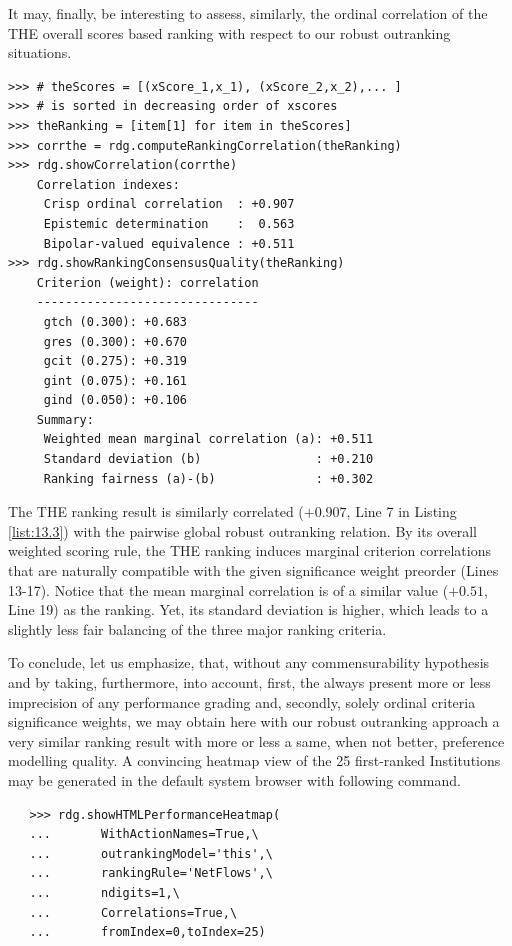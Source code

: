It may, finally, be interesting to assess, similarly, the ordinal correlation of the THE overall scores based ranking with respect to our robust outranking situations.

\begin{lstlisting}[caption={Computing the ordinal quality of the THE ranking},label=list:13.13]
>>> # theScores = [(xScore_1,x_1), (xScore_2,x_2),... ]
>>> # is sorted in decreasing order of xscores
>>> theRanking = [item[1] for item in theScores]
>>> corrthe = rdg.computeRankingCorrelation(theRanking)
>>> rdg.showCorrelation(corrthe)
    Correlation indexes:
     Crisp ordinal correlation  : +0.907
     Epistemic determination    :  0.563
     Bipolar-valued equivalence : +0.511
>>> rdg.showRankingConsensusQuality(theRanking)
    Criterion (weight): correlation
    -------------------------------
     gtch (0.300): +0.683
     gres (0.300): +0.670
     gcit (0.275): +0.319
     gint (0.075): +0.161
     gind (0.050): +0.106
    Summary:
     Weighted mean marginal correlation (a): +0.511
     Standard deviation (b)                : +0.210
     Ranking fairness (a)-(b)              : +0.302
\end{lstlisting}

The THE ranking result is similarly correlated ($+0.907$, Line 7 in Listing \ref{list:13.3}) with the pairwise global robust outranking relation. By its overall weighted scoring rule, the THE ranking induces marginal criterion correlations that are naturally compatible with the given significance weight preorder (Lines 13-17). Notice that the mean marginal correlation is of a similar value ($+0.51$, Line 19) as the \NetFlows ranking. Yet, its standard deviation is higher, which leads to a slightly less fair balancing of the three major ranking criteria.

To conclude, let us emphasize, that, without any commensurability hypothesis and by taking, furthermore, into account, first, the always present more or less imprecision of any performance grading and, secondly, solely ordinal criteria significance weights, we may obtain here with our robust outranking approach a very similar ranking result with more or less a same, when not better, preference modelling quality. A convincing heatmap view of the 25 first-ranked Institutions may be generated in the default system browser with following command.

\begin{lstlisting}
   >>> rdg.showHTMLPerformanceHeatmap(
   ...       WithActionNames=True,\
   ...       outrankingModel='this',\
   ...       rankingRule='NetFlows',\
   ...       ndigits=1,\
   ...       Correlations=True,\
   ...       fromIndex=0,toIndex=25)
 \end{lstlisting}

